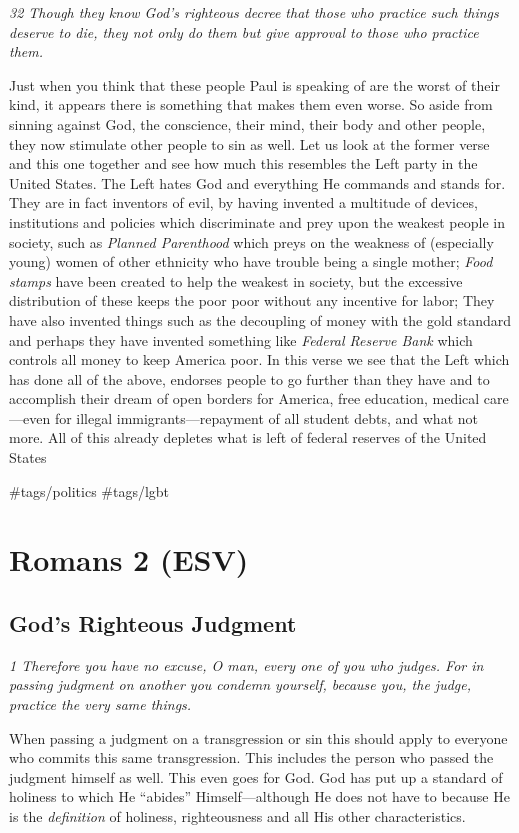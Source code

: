 \emph{32 Though they know God's righteous decree that those who practice
such things deserve to die, they not only do them but give approval to
those who practice them.}

Just when you think that these people Paul is speaking of are the worst
of their kind, it appears there is something that makes them even worse.
So aside from sinning against God, the conscience, their mind, their
body and other people, they now stimulate other people to sin as well.
Let us look at the former verse and this one together and see how much
this resembles the Left party in the United States. The Left hates God
and everything He commands and stands for. They are in fact inventors of
evil, by having invented a multitude of devices, institutions and
policies which discriminate and prey upon the weakest people in society,
such as \emph{Planned Parenthood} which preys on the weakness of
(especially young) women of other ethnicity who have trouble being a
single mother; \emph{Food stamps} have been created to help the weakest
in society, but the excessive distribution of these keeps the poor poor
without any incentive for labor; They have also invented things such as
the decoupling of money with the gold standard and perhaps they have
invented something like \emph{Federal Reserve Bank} which controls all
money to keep America poor. In this verse we see that the Left which has
done all of the above, endorses people to go further than they have and
to accomplish their dream of open borders for America, free education,
medical care---even for illegal immigrants---repayment of all student
debts, and what not more. All of this already depletes what is left of
federal reserves of the United States

 \#tags/politics \#tags/lgbt


\hypertarget{romans-2-esv}{%
\section{Romans 2 (ESV)}\label{romans-2-esv}}
\vspace{10.5cm}
\subsection{God's Righteous Judgment} \emph{1 Therefore you have no excuse,
O man, every one of you who judges. For in passing judgment on another
you condemn yourself, because you, the judge, practice the very same
things.}

When passing a judgment on a transgression or sin this should apply to
everyone who commits this same transgression. This includes the person
who passed the judgment himself as well. This even goes for God. God has
put up a standard of holiness to which He ``abides'' Himself---although
He does not have to because He is the \emph{definition} of holiness,
righteousness and all His other characteristics.

